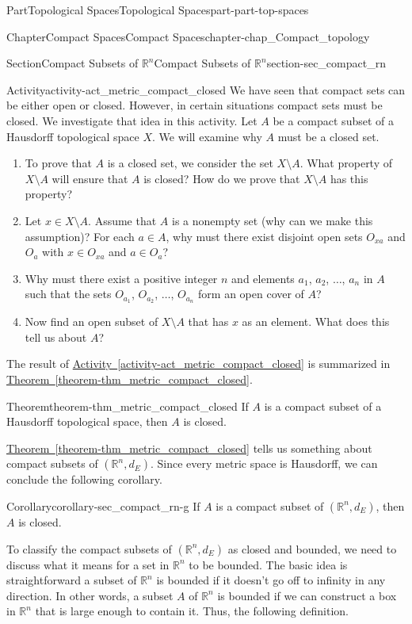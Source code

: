 \documentclass[oneside,10pt,]{book}
\newcommand{\xreffont}{\relax}
\numberwithin{equation}{chapter}
\newcommand{\R}{\mathbb{R}}
\begin{document}
\begin{partptx}{Part}{Topological Spaces}{}{Topological Spaces}{}{}{part-part-top-spaces}
\begin{chapterptx}{Chapter}{Compact Spaces}{}{Compact Spaces}{}{}{chapter-chap_Compact_topology}
\begin{sectionptx}{Section}{Compact Subsets of \(\R^n\)}{}{Compact Subsets of \(\R^n\)}{}{}{section-sec_compact_rn}
\begin{activity}{Activity}{}{activity-act_metric_compact_closed}
We have seen that compact sets can be either open or closed. However, in certain situations compact sets must be closed. We investigate that idea in this activity. Let \(A\) be a compact subset of a Hausdorff topological space \(X\). We will examine why \(A\) must be a closed set.%
\begin{enumerate}[font=\bfseries,label=(\alph*),ref=\alph*]%
\item{}To prove that \(A\) is a closed set, we consider the set \(X \setminus A\). What property of \(X \setminus A\) will ensure that \(A\) is closed? How do we prove that \(X \setminus A\) has this property?%
\item{}Let \(x \in X \setminus A\). Assume that \(A\) is a nonempty set (why can we make this assumption)? For each \(a \in A\), why must there exist disjoint open sets \(O_{xa}\) and \(O_a\) with \(x \in O_{xa}\) and \(a \in O_a\)?%
\item{}Why must there exist a positive integer \(n\) and elements \(a_1\), \(a_2\), \(\ldots\), \(a_n\) in \(A\) such that the sets \(O_{a_1}\), \(O_{a_2}\), \(\ldots\), \(O_{a_n}\) form an open cover of \(A\)?%
\item{}Now find an open subset of \(X \setminus A\) that has \(x\) as an element. What does this tell us about \(A\)?%
\end{enumerate}%
\end{activity}%
The result of \hyperref[activity-act_metric_compact_closed]{Activity~{\xreffont\ref{activity-act_metric_compact_closed}}} is summarized in \hyperref[theorem-thm_metric_compact_closed]{Theorem~{\xreffont\ref{theorem-thm_metric_compact_closed}}}.%
\begin{theorem}{Theorem}{}{}{theorem-thm_metric_compact_closed}%
If \(A\) is a compact subset of a Hausdorff topological space, then \(A\) is closed.%
\end{theorem}
\hyperref[theorem-thm_metric_compact_closed]{Theorem~{\xreffont\ref{theorem-thm_metric_compact_closed}}} tells us something about compact subsets of \((\R^n, d_E)\). Since every metric space is Hausdorff, we can conclude the following corollary.%
\begin{corollary}{Corollary}{}{}{corollary-sec_compact_rn-g}%
If \(A\) is a compact subset of \((\R^n, d_E)\), then \(A\) is closed.%
\end{corollary}
To classify the compact subsets of \((\R^n, d_E)\) as closed and bounded, we need to discuss what it means for a set in \(\R^n\) to be bounded. The basic idea is straightforward \textemdash{} a subset of \(\R^n\) is bounded if it doesn't go off to infinity in any direction. In other words, a subset \(A\) of \(\R^n\) is bounded if we can construct a box in \(\R^n\) that is large enough to contain it. Thus, the following definition.%

\end{sectionptx}
\end{chapterptx}
\end{partptx}
\end{document}
